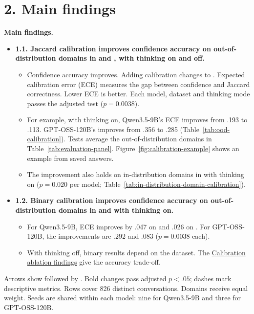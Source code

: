 \begingroup\fontsize{9}{10}\selectfont\setlength{\parskip}{0.10em}
\section*{2. Main findings}
\par\smallskip\textbf{Main findings.}
\begin{itemize}
\item \textbf{1.1. Jaccard calibration improves confidence accuracy on out-of-distribution domains in \SP{} and \DB{}, with thinking on and off.}
\begin{itemize}
\item \underline{Confidence accuracy improves.} Adding calibration changes \armA{} to \armB{}. Expected calibration error (ECE) measures the gap between confidence and Jaccard correctness. Lower ECE is better. Each model, dataset and thinking mode passes the adjusted test ($p=0.0038$).
\item For example, with thinking on, Qwen3.5-9B's \SP{} ECE improves from .193 to .113. GPT-OSS-120B's improves from .356 to .285 (Table~\ref{tab:ood-calibration}). Tests average the out-of-distribution domains in Table~\ref{tab:evaluation-panel}. Figure~\ref{fig:calibration-example} shows an example from saved answers.
\item The improvement also holds on in-distribution domains in \SP{} with thinking on ($p=0.020$ per model; Table~\ref{tab:in-distribution-domain-calibration}).
\end{itemize}
\item \textbf{1.2. Binary calibration improves confidence accuracy on out-of-distribution domains in \SP{} and \DB{} with thinking on.}
\begin{itemize}
\item For Qwen3.5-9B, ECE improves by .047 on \SP{} and .026 on \DB{}. For GPT-OSS-120B, the improvements are .292 and .083 ($p=0.0038$ each).
\item With thinking off, binary results depend on the dataset. The \hyperref[sec:calibration-ablations]{Calibration ablation findings} give the accuracy trade-off.
\end{itemize}
\end{itemize}
 Arrows show \armA{} followed by \armB{}. Bold changes pass adjusted $p<.05$; dashes mark descriptive metrics. Rows cover 826 distinct conversations. Domains receive equal weight. Seeds are shared within each model: nine for Qwen3.5-9B and three for GPT-OSS-120B.
